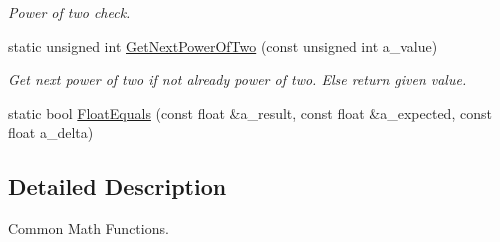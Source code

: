 \begin{DoxyCompactItemize}
\begin{DoxyCompactList}\small\item\em Power of two check. \end{DoxyCompactList}\item 
static unsigned int \hyperlink{class_ai_math_1_1_a_math_aaf28e85c9da7d5085d811f43a8dd1160}{Get\+Next\+Power\+Of\+Two} (const unsigned int a\+\_\+value)
\begin{DoxyCompactList}\small\item\em Get next power of two if not already power of two. Else return given value. \end{DoxyCompactList}\item 
static bool \hyperlink{class_ai_math_1_1_a_math_a8a2922e06ea11ae2938bc57a8d138ad3}{Float\+Equals} (const float \&a\+\_\+result, const float \&a\+\_\+expected, const float a\+\_\+delta)
\end{DoxyCompactItemize}


\subsection{Detailed Description}
Common Math Functions. 

